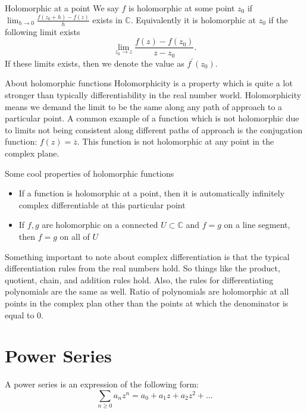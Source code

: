 \documentclass{article}
\begin{document}
\begin{defn}{Holomorphic at a point}{}
We say \( f \) is holomorphic at some point \( z_0 \) if \( \lim_{h \to 0} \frac{f(z_{0} + h )- f(z)}{h}  \) exists in \( \mathbb{C} \). Equivalently it is holomorphic at \( z_0 \) if the following limit exists
\[
    \lim_{z_0 \to z} \frac{f(z)- f(z_0)}{z - z_{0}} .
\]
If these limits exists, then we denote the value as \( f^\prime (z_0) \).
\end{defn}

\begin{rmk}{About holomorphic functions}{}
Holomorphicity is a property which is quite a lot stronger than typically differentiability in the real number world. Holomorphicity means we demand the limit to be the same along any path of approach to a particular point. A common example of a function which is not holomorphic due to limits not being consistent along different paths of approach is the conjugation function: \( f(z) = \overline{z} . \) This function is not holomorphic at any point in the complex plane. 

\hfill

Some cool properties of holomorphic functions
\begin{itemize}
    \item If a function is holomorphic at a point, then it is automatically infinitely complex differentiable at this particular point
    \item If \( f,g \) are holomorphic on a connected \( U \subset \mathbb{C}  \) and \( f = g \) on a line segment, then \( f = g  \) on all of \( U \) 
\end{itemize}
\end{rmk}

Something important to note about complex differentiation is that the typical differentiation rules from the real numbers hold. So things like the product, quotient, chain, and addition rules hold. Also, the rules for differentiating polynomials are the same as well. Ratio of polynomials are holomorphic at all points in the complex plan other than the points at which the denominator is equal to \( 0 \).

\section{Power Series}

A power series is an expression of the following form:
\[
    \sum_{n\geq 0} a_{n} z^n = a_{0} + a_{1}z + a_2 z^{2} + \dots   
\]
\end{document}
